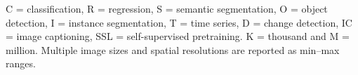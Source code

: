\vspace{-0.3em}
\begin{center}
\begin{minipage}{0.988\textwidth}
\fontsize{5.7}{6.8}\selectfont
C = classification, R = regression, S = semantic segmentation, O = object detection, I = instance segmentation, T = time series, D = change detection, IC = image captioning, SSL = self-supervised pretraining. K = thousand and M = million. Multiple image sizes and spatial resolutions are reported as min--max ranges.
\end{minipage}
\end{center}
\endgroup
\restoregeometry